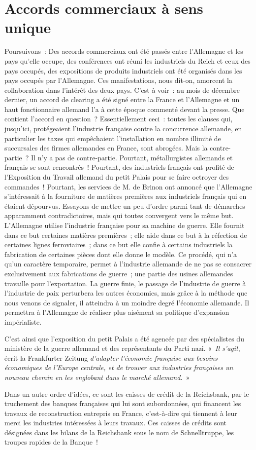 \documentclass[french,twoside]{book} %
\begin{document}
\section[Accords commerciaux à sens unique]{Accords commerciaux à sens unique}
\noindent Poursuivons : Des accords commerciaux ont été passés entre l’Allemagne et les pays qu’elle occupe, des conférences ont réuni les industriels du Reich et ceux des pays occupés, des expositions de produits industriels ont été organisés dans les pays occupés par l’Allemagne. Ces manifestations, nous dit-on, amorcent la collaboration dans l’intérêt des deux pays. C’est à voir : au mois de décembre dernier, un accord de clearing a été signé entre la France et l’Allemagne et un haut fonctionnaire allemand l’a à cette époque commenté devant la presse. Que contient l’accord en question ? Essentiellement ceci : toutes les clauses qui, jusqu’ici, protégeaient l’industrie française contre la concurrence allemande, en particulier les taxes qui empêchaient l’installation en nombre illimité de succursales des firmes allemandes en France, sont abrogées. Mais la contre-partie ? Il n’y a pas de contre-partie. Pourtant, métallurgistes allemands et français se sont rencontrés ! Pourtant, des industriels français ont profité de l’Exposition du Travail allemand du petit Palais pour se faire octroyer des commandes ! Pourtant, les services de M. de Brinon ont annoncé que l’Allemagne s’intéressait à la fourniture de matières premières aux industriels français qui en étaient dépourvus. Essayons de mettre un peu d’ordre parmi tant de démarches apparamment contradictoires, mais qui toutes convergent vers le même but. L’Allemagne utilise l’industrie française pour sa machine de guerre. Elle fournit dans ce but certaines matières premières ; elle aide dans ce but à la réfection de certaines lignes ferroviaires ; dans ce but elle confie à certains industriels la fabrication de certaines pièces dont elle donne le modèle. Ce procédé, qui n’a qu’un caractère temporaire, permet à l’industrie allemande de ne pas se consacrer exclusivement aux fabrications de guerre ; une partie des usines allemandes travaille pour l’exportation. La guerre finie, le passage de l’industrie de guerre à l’industrie de paix perturbera les autres économies, mais grâce à la méthode que nous venons de signaler, il atteindra à un moindre degré l’économie allemande. Il permettra à l’Allemagne de réaliser plus aisément sa politique d’expansion impérialiste.\par
C’est ainsi que l’exposition du petit Palais a été agencée par des spécialistes du ministère de la guerre allemand et des représentants du Parti nazi. « \emph{Il s’agit}, écrit la Frankfurter Zeitung \emph{d’adapter l’économie française aux besoins économiques de l’Europe centrale, et de trouver aux industries françaises un nouveau chemin en les englobant dans le marché allemand.} »\par
Dans un autre ordre d’idées, ce sont les caisses de crédit de la Reichsbank, par le truchement des banques françaises qui lui sont subordonnées, qui financent les travaux de reconstruction entrepris en France, c’est-à-dire qui tiennent à leur merci les industries intéressées à leurs travaux. Ces caisses de crédits sont désignées dans les bilans de la Reichsbank sous le nom de Schnelltruppe, les troupes rapides de la Banque !
\end{document}
